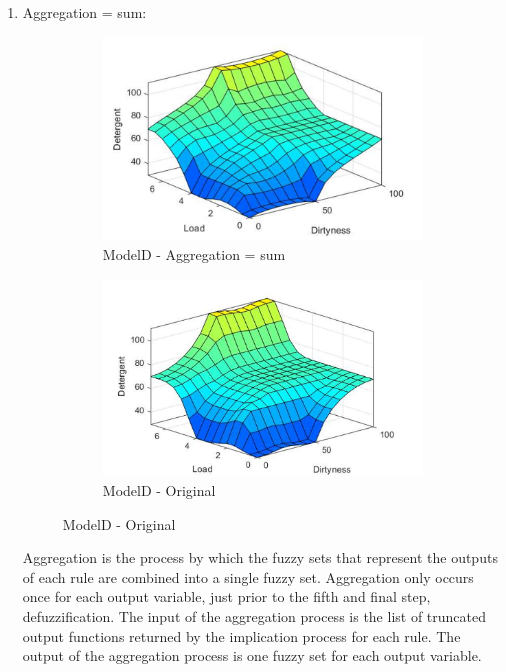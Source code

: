 \documentclass[11pt]{article}
\begin{document}
\begin{enumerate}[label=(\alph*)]
  \begin{enumerate}[label=(\roman*)]

    \item Aggregation = sum:

    \begin{figure}[ht!]
    \centering
    \begin{subfigure}{.5\textwidth}
      \centering
      \includegraphics[width=.9\linewidth]{res/modelD_aggregation}
      \caption{ModelD - Aggregation = sum}
      \label{fig:sub1}
    \end{subfigure}%
    \begin{subfigure}{.5\textwidth}
      \centering
      \includegraphics[width=.9\linewidth]{res/image2}
      \caption{ModelD - Original}
      \label{fig:sub2}
    \end{subfigure}
    \end{figure}

    Aggregation is the process by which the fuzzy sets that represent the
    outputs of each rule are combined into a single fuzzy set. Aggregation only
    occurs once for each output variable, just prior to the fifth and final
    step, defuzzification. The input of the aggregation process is the list of
    truncated output functions returned by the implication process for each
    rule. The output of the aggregation process is one fuzzy set for each
    output variable.


\end{enumerate}
\end{enumerate}
\end{document}
